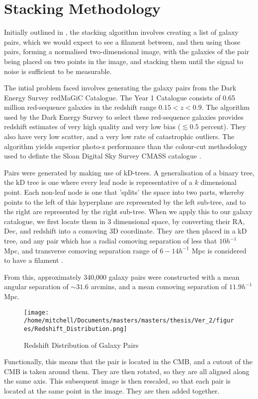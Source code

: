 \chapter{Stacking Methodology}
Initially outlined in \cite{2016MNRAS.457.2391C}, the stacking algorithm involves creating a list of galaxy pairs, which we would expect to see a filament between, and then using those pairs, forming a normalised two-dimensional image, with the galaxies of the pair being placed on two points in the image, and stacking them until the signal to noise is sufficient to be measurable.

The intial problem faced involves generating the galaxy pairs from the Dark Energy Survey redMaGiC Catalogue. The Year 1 Catalogue consists of 0.65 million red-sequence galaxies in the redshift range $0.15 < z < 0.9 $. The algorithm used by the Dark Energy Survey to select these red-sequence galaxies provides redshift estimates of very high quality and very low bias ($\lesssim 0.5$ percent). They also have very low scatter, and a very low rate of catastrophic outliers. The algorithm yields superior photo-z performance than the colour-cut methodology used to definte the Sloan Digital Sky Survey CMASS catalogue \citep{2016MNRAS.461.1431R}. 

Pairs were generated by making use of kD-trees. A generalisation of a binary tree, the kD tree is one where every leaf node is representative of a $k$ dimensional point. Each non-leaf node is one that 'splits' the space into two parts, whereby points to the left of this hyperplane are represented by the left sub-tree, and to the right are represented by the right sub-tree. When we apply this to our galaxy catalogue, we first locate them in 3 dimensional space, by converting their RA, Dec, and redshift into a comoving 3D coordinate. They are then placed in a kD tree, and any pair which has a radial comoving separation of less that $10 h^{-1} $ Mpc, and transverse comoving separation range of $6 - 14 h^{-1} $ Mpc is considered to have a filament \citep{2016MNRAS.457.2391C}.

From this, approximately 340,000 galaxy pairs were constructed with a mean angular separation of $\sim 31.6 $ arcmins, and a mean comoving separation of $11.9 h^{-1}$ Mpc. 
\begin{figure}[h!]
\centering
\texttt{[image: /home/mitchell/Documents/masters/masters/thesis/Ver\_2/figures/Redshift\_Distribution.png]}
\caption{Redshift Distribution of Galaxy Pairs}
\end{figure}



Functionally, this means that the pair is located in the CMB, and a cutout of the CMB is taken around them. They are then rotated, so they are all aligned along the same axis. This subsequent image is then rescaled, so that each pair is located at the same point in the image. They are then added together. 
